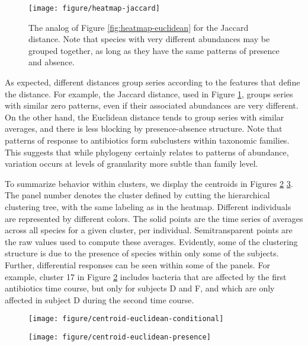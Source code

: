 \documentclass[14pt]{extarticle}
\begin{document}
\begin{figure}
  \centering
  \texttt{[image: figure/heatmap-jaccard]}
  \caption{The analog of Figure \ref{fig:heatmap-euclidean} for the Jaccard
    distance. Note that species with very different abundances may be grouped
    together, as long as they have the same patterns of presence and absence.
    \label{fig:heatmap-jaccard} }
\end{figure}

As expected, different distances group series according to the features that
define the distance. For example, the Jaccard distance, used in Figure
\ref{fig:heatmap-jaccard}, groups series with similar zero patterns, even if
their associated abundances are very different. On the other hand, the Euclidean
distance tends to group series with similar averages, and there is less blocking
by presence-absence structure. Note that patterns of response to antibiotics
form subclusters within taxonomic families. This suggests that while phylogeny
certainly relates to patterns of abundance, variation occurs at levels of
granularity more subtle than family level.

To summarize behavior within clusters, we display the centroids in Figures
\ref{fig:centroid-euclidean-conditional} \ref{fig:centroid-euclidean-presence}.
The panel number denotes the cluster defined by cutting the hierarchical
clustering tree, with the same labeling as in the heatmap. Different individuals
are represented by different colors. The solid points are the time series of
averages across all species for a given cluster, per individual. Semitransparent
points are the raw values used to compute these averages. Evidently, some of the
clustering structure is due to the presence of species within only some of the
subjects. Further, differential responses can be seen within some of the panels.
For example, cluster 17 in Figure \ref{fig:centroid-euclidean-conditional}
includes bacteria that are affected by the first antibiotics time course, but
only for subjects D and F, and which are only affected in subject D during the
second time course.

\begin{figure}
  \centering
  \texttt{[image: figure/centroid-euclidean-conditional]}
  \caption{\label{fig:centroid-euclidean-conditional} }
\end{figure}

\begin{figure}
  \centering
  \texttt{[image: figure/centroid-euclidean-presence]}
  \caption{\label{fig:centroid-euclidean-presence} }
\end{figure}
\end{document}
